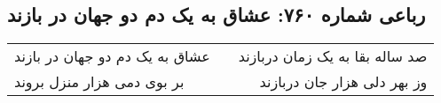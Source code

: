 \begin{center}
\section*{رباعی شماره ۷۶۰: عشاق به یک دم دو جهان در بازند}
\label{sec:0760}
\begin{longtable}{l p{0.5cm} r}
عشاق به یک دم دو جهان در بازند
&&
صد ساله بقا به یک زمان دربازند
\\
بر بوی دمی هزار منزل بروند
&&
وز بهر دلی هزار جان دربازند
\\
\end{longtable}
\end{center}
